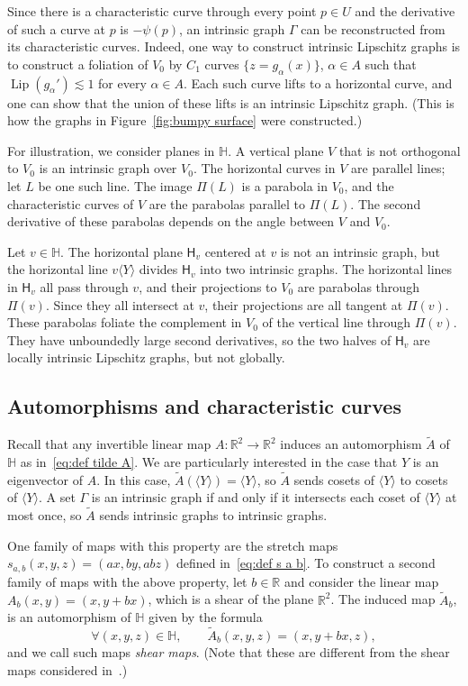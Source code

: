 \documentclass[11pt,reqno]{amsart}
\renewcommand{\H}{\mathbb{H}}
\newcommand{\R}{\mathbb{R}}
\newcommand{\0}{\mathbf{0}}
\renewcommand{\1}{\mathbf 1}
\newcommand{\from}{\colon}
\theoremstyle{remark}
\DeclareMathOperator{\Lip}{Lip}
\begin{document}
Since there is a characteristic curve through every point $p\in U$ and the derivative of such a curve at $p$ is $-\psi(p)$, an intrinsic graph $\Gamma$ can be reconstructed from its characteristic curves.  Indeed, one way to construct intrinsic Lipschitz graphs is to construct a foliation of $V_0$ by $C_1$ curves $\{z=g_\alpha(x)\}$, $\alpha\in A$ such that $\Lip(g_\alpha')\lesssim 1$ for every $\alpha\in A$.  Each such curve lifts to a horizontal curve, and one can show that the union of these lifts is an intrinsic Lipschitz graph.  (This is how the graphs in Figure~\ref{fig:bumpy surface} were constructed.)

For illustration, we consider planes in $\H$.  A vertical plane $V$ that is not orthogonal to $V_0$ is an intrinsic graph over $V_0$.  The horizontal curves in $V$ are parallel lines; let $L$ be one such line.  The image $\Pi(L)$ is a parabola in $V_0$, and the characteristic curves of $V$ are the parabolas parallel to $\Pi(L)$.  The second derivative of these parabolas depends on the angle between $V$ and $V_0$.

Let $v\in \H$.  The horizontal plane $\mathsf{H}_v$ centered at $v$ is not an intrinsic graph, but the horizontal line $v\langle Y\rangle$ divides $\mathsf{H}_v$ into two intrinsic graphs.  The horizontal lines in $\mathsf{H}_v$ all pass through $v$, and their projections to $V_0$ are parabolas through $\Pi(v)$.  Since they all intersect at $v$, their projections are all tangent at $\Pi(v)$.  These parabolas foliate the complement in $V_0$ of the vertical line through $\Pi(v)$.  They have unboundedly large second derivatives, so the two halves of $\mathsf{H}_v$ are locally intrinsic Lipschitz graphs, but not globally.

\subsection{Automorphisms and characteristic curves}\label{sec:automs and ccs} Recall that any invertible linear map $A\from \R^2\to \R^2$ induces an automorphism $\tilde A$ of $\H$ as in~\eqref{eq:def tilde A}.  We are particularly interested in the case that $Y$ is an eigenvector of $A$.  In this case, $\tilde{A}(\langle Y\rangle)=\langle Y\rangle$, so $\tilde{A}$ sends cosets of $\langle Y\rangle$ to cosets of $\langle Y\rangle$.  A set $\Gamma$ is an intrinsic graph if and only if it intersects each coset of $\langle Y\rangle$ at most once, so $\tilde{A}$ sends intrinsic graphs to intrinsic graphs.

One family of maps with this property are the stretch maps $s_{a,b}(x,y,z)=(ax,by,abz)$ defined in~\eqref{eq:def s a b}.  To construct a second family of maps with the above property, let $b\in \R$ and consider the linear map $A_b(x,y)=(x,y+bx)$, which is a shear of the plane $\R^2$. The induced map $\tilde{A}_b$, is an automorphism of $\H$ given by the formula
$$\forall (x,y,z)\in \H,\qquad \tilde{A}_b(x,y,z)=(x,y+bx,z),$$
and we call such maps \emph{shear maps}.  (Note that these are different from the shear maps considered in~\cite{Xie16}.)
\end{document}
